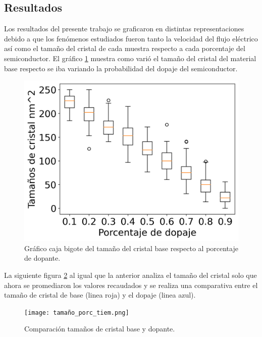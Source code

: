 \documentclass[9pt,twocolumn,twoside]{osajnl}
\begin{document}
\subsection{Resultados}
Los resultados del presente trabajo se graficaron en distintas representaciones debido a que los fenómenos estudiados fueron tanto la velocidad del flujo eléctrico así como el tamaño del cristal de cada muestra respecto a cada porcentaje del semiconductor.
El gráfico \ref{im1} muestra como varió el tamaño del cristal del material base respecto se iba variando la probabilidad del dopaje del semiconductor.
\begin{figure}[h!]
    \centering
    \includegraphics[scale=.5]{cris_porc.png}
    \caption{Gráfico caja bigote del tamaño del cristal base respecto al porcentaje de dopante.}
    \label{im1}
\end{figure}

La siguiente figura \ref{im2} al igual que la anterior analiza el tamaño del cristal solo que ahora se promediaron los valores recaudados y se realiza una comparativa entre el tamaño de cristal de base (linea roja) y el dopaje (linea azul).
\begin{figure}[h!]
    \centering
    \texttt{[image: tamaño\_porc\_tiem.png]}
    \caption{Comparación tamaños de cristal base y dopante.}
    \label{im2}
\end{figure}
\end{document}
